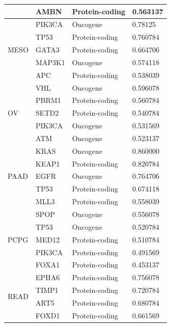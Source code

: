 \begin{table}
\begin{center}
{\begin{tabular}{l|l|l|l}
        & AMBN & Protein-coding & 0.563137 \\ %
        \midrule
        \multirow{5}{*}{MESO} & PIK3CA & Oncogene & 0.78125 \\ %
        & TP53 & Protein-coding & 0.760784 \\ %
        & GATA3  & Protein-coding & 0.664706 \\ %
        & MAP3K1  & Oncogene & 0.574118 \\ %
        & APC   & Protein-coding & 0.538039 \\ 
        \midrule
        \multirow{5}{*}{OV} & VHL & Oncogene & 0.596078 \\ %
        & PBRM1 & Protein-coding  & 0.560784 \\ %
        & SETD2 & Protein-coding & 0.540784 \\ %
        & PIK3CA & Oncogene & 0.531569 \\ %
        & ATM & Oncogene & 0.523137 \\ %
        \midrule
        \multirow{5}{*}{PAAD}& KRAS & Oncogene & 0.860000 \\ %
        & KEAP1 & Protein-coding & 0.820784 \\ %
        & EGFR & Oncogene & 0.764706 \\ %
        & TP53 & Protein-coding & 0.674118 \\ %
        & MLL3 & Protein-coding & 0.558039 \\ %
        \midrule
        \multirow{5}{*}{PCPG}& SPOP & Oncogene & 0.556078 \\ %
        & TP53 & Oncogene & 0.520784 \\ %
        & MED12 & Protein-coding & 0.510784 \\ %
        & PIK3CA & Protein-coding & 0.491569 \\ %
        & FOXA1 & Protein-coding & 0.453137 \\ %
        \midrule 
        \multirow{5}{*}{READ}& EPHA6 & Protein-coding & 0.756078 \\ %
        & TIMP1 & Protein-coding & 0.720784 \\ %
        & ART5 & Protein-coding & 0.680784 \\ %
        & FOXD1 & Protein-coding & 0.661569 \\ %

\end{tabular}}
\end{center}
\end{table}
